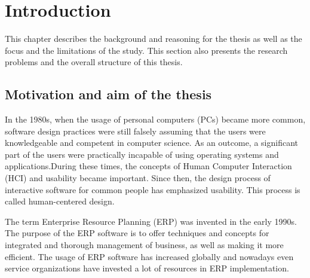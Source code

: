 \documentclass[12pt,a4paper,oneside,pdftex]{report}
\begin{document}
\label{pages-prelude}
\cleardoublepage

\startfirstchapter

\pagestyle{headings}


% 

\chapter{Introduction}
\label{chapter:introduction}
This chapter describes the background and reasoning for the thesis as well as the focus and the limitations of the study. This section also presents the research problems and the overall structure of this thesis. 

\section{Motivation and aim of the thesis}
\label{sec:motivationandaim}
In the 1980s, when the usage of personal computers (PCs) became more common, software design practices were still falsely assuming that the users were knowledgeable and competent in computer science. As an outcome, a significant part of the users were practically incapable of using operating systems and applications.During these times, the concepts of Human Computer Interaction (HCI) and usability became important. Since then, the design process of interactive software for common people has emphasized usability. This process is called human-centered design. \cite{RefWorks:9}

The term Enterprise Resource Planning (ERP) was invented in the early 1990s.\cite{RefWorks:3} The purpose of the ERP software is to offer techniques and concepts for integrated and thorough management of business, as well as making it more efficient.
The usage of ERP software has increased globally and nowadays even service organizations have invested a lot of resources in ERP implementation.\cite{RefWorks:1, RefWorks:7} 
\end{document}

